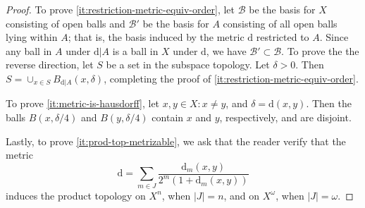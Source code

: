 \begin{proof}
To prove \cref{it:restriction-metric-equiv-order}, let 
\( \mathcal{B} \) be the basis for \( X \) consisting of open balls
and \( \mathcal{B'} \) be the basis for \( A \) consisting of all open balls
lying within \( A \); that is, the basis induced by the metric \( \mathrm{d} \)
restricted to \( A \). Since any ball in \( A \) under \( \mathrm{d}|A \) is a
ball in \( X \) under \( \mathrm{d} \), we have  \( \mathcal{B'} \subset
\mathcal{B} \). To prove the the reverse direction, let \( S \) be a set in the
subspace topology. Let \( \delta > 0 \). Then \( S = \cup_{x \in S}
B_{\mathrm{d}|A}(x, \delta) \), completing the proof of
\cref{it:restriction-metric-equiv-order}.
\par
To prove \cref{it:metric-is-hausdorff}, let \( x, y \in X: x \neq y \),
and \( \delta = \mathrm{d}(x,y) \). Then the balls \( B(x, \delta/4) \)
and \( B(y, \delta/4) \) contain \( x \) and \( y \), respectively, and are
disjoint.
\par
Lastly, to prove \cref{it:prod-top-metrizable}, we ask that the reader verify
that the metric
\begin{equation*}
\mathrm{d}  = \sum_{m \in J} \frac{\mathrm{d}_{m}(x,y)}{2^{m}(1 +
\mathrm{d}_{m}(x,y))}
\end{equation*}
induces the product topology on \(X^{n}\), when \(|J| = n\), and on
\( X^{\omega} \), when \( |J| = \omega \).
\end{proof}
